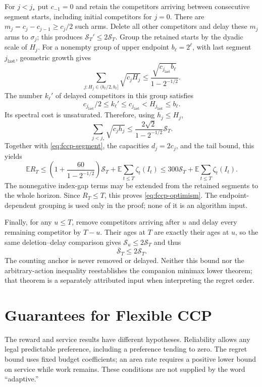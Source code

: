\documentclass[11pt]{article}
\theoremstyle{remark}
\newcommand{\E}{\mathbb E}
\begin{document}
For $j<j_*$ put $c_{-1}=0$ and retain the competitors arriving between
consecutive segment starts, including initial competitors for $j=0$.
There are $m_j=c_j-c_{j-1}\ge c_j/2$ such arms. Delete all other
competitors and delay these $m_j$ arms to $\sigma_j$; this produces
$\mathcal S_T'\le2\mathcal S_T$. Group the retained starts by the
dyadic scale of $H_j$. For a nonempty group of upper endpoint
$b_\ell=2^\ell$, with last segment $j_{\mathrm{last}}$, geometric
growth gives
\[
 \sum_{j:H_j\in(b_\ell/2,b_\ell]}\sqrt{c_jH_j}
 \le\frac{\sqrt{c_{j_{\mathrm{last}}}b_\ell}}
                  {1-2^{-1/2}}.
\]
The number $k_\ell'$ of delayed competitors in this group satisfies
\[
 c_{j_{\mathrm{last}}}/2\le k_\ell'\le c_{j_{\mathrm{last}}}
           <H_{j_{\mathrm{last}}}\le b_\ell.
\]
Its spectral cost is unsaturated. Therefore, using $h_j\le H_j$,
\[
 \sum_{j<j_*}\sqrt{c_jh_j}
 \le\frac{2\sqrt2}{1-2^{-1/2}}\mathcal S_T.
\]
Together with \eqref{eq:fccp-segment}, the capacities $d_j=2c_j$,
and the tail bound, this yields
\begin{equation}\label{eq:fccp-optimism-proof}
 \E R_T\le
 \left(1+\frac{60}{1-2^{-1/2}}\right)\mathcal S_T
       +\E\sum_{t\le T}\zeta_t(I_t)
 \le300\mathcal S_T+\E\sum_{t\le T}\zeta_t(I_t).
\end{equation}
The nonnegative index-gap terms may be extended from the retained
segments to the whole horizon. Since $R_T\le T$, this proves
\eqref{eq:fccp-optimism}. The endpoint-dependent grouping is used
only in the proof; none of it is an algorithm input.

Finally, for any $u\le T$, remove competitors arriving after $u$ and
delay every remaining competitor by $T-u$. Their ages at $T$ are
exactly their ages at $u$, so the same deletion--delay comparison gives
$\mathcal S_u\le2\mathcal S_T$ and thus
\begin{equation}\label{eq:fccp-running-spectrum}
 \overline{\mathcal S}_T\le2\mathcal S_T.
\end{equation}
The counting anchor is never removed or delayed. Neither this bound
nor the arbitrary-action inequality reestablishes the companion
minimax lower theorem; that theorem is a separately attributed input
when interpreting the regret order.
\section{Guarantees for Flexible CCP}\label{app:fccp-guarantees}
The reward and service results have different hypotheses. Reliability
allows any legal predictable preference, including a preference tending
to zero. The regret bound uses fixed budget coefficients; an area rate
requires a positive lower bound on service while work remains. These
conditions are not supplied by the word ``adaptive.''
\end{document}
